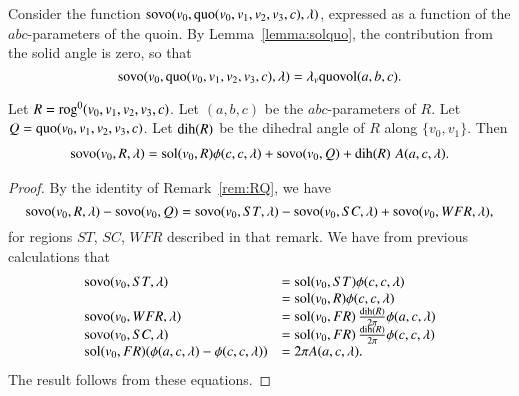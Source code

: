 Consider the function
${\operatorname{sovo}}(v_0,\operatorname{quo}(v_0,v_1,v_2,v_3,c),\lambda)$, expressed
as a function of the $abc$-parameters of the quoin.  By
Lemma~\ref{lemma:solquo}, the contribution from the solid angle
is zero, so that
$$
{\operatorname{sovo}}(v_0,\operatorname{quo}(v_0,v_1,v_2,v_3,c),\lambda) = 
 \lambda_v {\operatorname{quovol}}(a,b,c).
$$


\begin{lemma}  Let $R = {\operatorname{rog}}^0(v_0,
v_1,v_2,v_3,c)$.  Let $(a,b,c)$ be the $abc$-parameters of $R$.
Let $Q=\operatorname{quo}(v_0,v_1,v_2,v_3,c)$.  Let ${\operatorname{dih}}(R)$ be the
dihedral angle of $R$ along $\{v_0,v_1\}$.
Then
  $$
  \begin{array}{lll}
  {\operatorname{sovo}}(v_0,R,\lambda) = \operatorname{sol}(v_0,R)\phi(c,c,\lambda) +
  {\operatorname{sovo}}(v_0,Q) + {\operatorname{dih}}(R)\,\, A(a,c,\lambda).
  \end{array}
  $$
\end{lemma}

\begin{proof}
By the identity of Remark~\ref{rem:RQ}, we have
  $$
  {\operatorname{sovo}}(v_0,R,\lambda) - {\operatorname{sovo}}(v_0,Q) = 
  {\operatorname{sovo}}(v_0,ST,\lambda) - {\operatorname{sovo}}(v_0,SC,\lambda) + 
  {\operatorname{sovo}}(v_0,WFR,\lambda),
  $$
for regions $ST$, $SC$, $WFR$ described in that remark.
We have from previous calculations that
  $$
  \begin{array}{lll}
  {\operatorname{sovo}}(v_0,ST,\lambda) &= \operatorname{sol}(v_0,ST)\phi(c,c,\lambda) \\ &= 
  \operatorname{sol}(v_0,R)\phi(c,c,\lambda)\\
  {\operatorname{sovo}}(v_0,WFR,\lambda) &= {\operatorname{sol}}(v_0,FR)\,\frac{\operatorname{dih}(R)}{2\pi}
   \phi(a,c,\lambda)\\
  {\operatorname{sovo}}(v_0,SC,\lambda) &= {\operatorname{sol}}(v_0,FR)\,\frac{\operatorname{dih}(R)}{2\pi}
   \phi(c,c,\lambda)\\ 
  {\operatorname{sol}}(v_0,FR) (\phi(a,c,\lambda) -\phi(c,c,\lambda)) &=
   2\pi A(a,c,\lambda).
  \end{array}
  $$
The result follows from these equations.
\end{proof}



